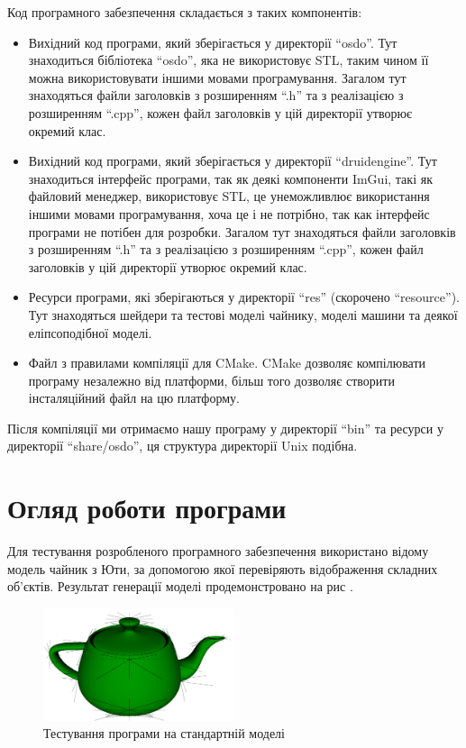 \let\mypdfximage\pdfximage\def\pdfximage{\immediate\mypdfximage}\documentclass[14pt,a4paper]{extarticle}
\theoremstyle{definition}
\renewcommand{\[}{\begin{singlespace}\begin{equation*}}
\renewcommand{\]}{\end{equation*}\end{singlespace}}
\renewcommand{\+}{\discretionary{\mbox{\scriptsize$\hookleftarrow$}}{}{}}
\begin{document}
Код програмного забезпечення складається з таких компонентів:
\begin{itemize}
\item Вихідний код програми, який зберігається у директорії ``osdo''. Тут знаходиться бібліотека ``osdo'', яка не використовує STL, таким чином її можна використовувати іншими мовами програмування. Загалом тут знаходяться файли заголовків з розширенням ``.h'' та з реалізацією з розширенням ``.cpp'', кожен файл заголовків у цій директорії утворює окремий клас.
\item Вихідний код програми, який зберігається у директорії ``druidengine''. Тут знаходиться інтерфейс програми, так як деякі компоненти ImGui, такі як файловий менеджер, використовує STL, це унеможливлює використання іншими мовами програмування, хоча це і не потрібно, так как інтерфейс програми не потібен для розробки. Загалом тут знаходяться файли заголовків з розширенням ``.h'' та з реалізацією з розширенням ``.cpp'', кожен файл заголовків у цій директорії утворює окремий клас.
\item Ресурси програми, які зберігаються у директорії ``res'' (скорочено ``resource''). Тут знаходяться шейдери та тестові моделі чайнику, моделі машини та деякої еліпсоподібної моделі.
\item Файл з правилами компіляції для CMake. CMake дозволяє компілювати програму незалежно від платформи, більш того дозволяє створити інсталяційний файл на цю платформу.
\end{itemize}

Після компіляції ми отримаємо нашу програму у директорії ``bin'' та ресурси у директорії ``share/osdo'', ця структура директорії Unix подібна.

\section{Огляд роботи програми}

Для тестування розробленого програмного забезпечення використано відому модель чайник з Юти, за допомогою якої перевіряють відображення складних об'єктів.  Результат генерації моделі продемонстровано на рис \cite{fig:testing-teapot}.

\begin{figure}[!htb]
    \centering
    \includegraphics[width=0.5\textwidth]{testing-teapot.png}
    \caption{Тестування програми на стандартній моделі}\label{fig:testing-teapot}
\end{figure}
\end{document}
